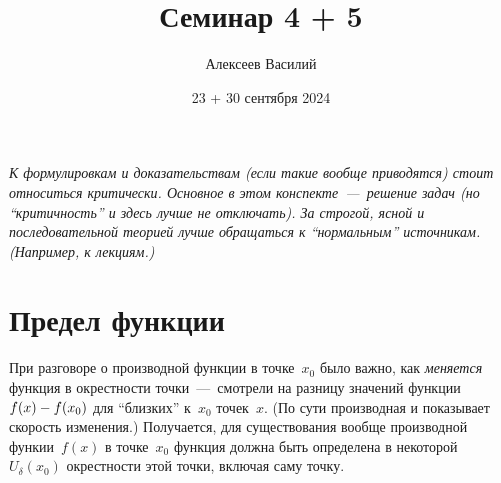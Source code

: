 \documentclass[a4paper,12pt]{article}
\author{Алексеев Василий}
\title{Семинар 4 + 5}
\date{23 + 30 сентября 2024}
\begin{document}
  \maketitle
  
  \tableofcontents

  \thispagestyle{empty}
  
  \newpage
  
  
  
  \vspace*{\fill}
  
  \noindent
  \emph{
    К формулировкам и доказательствам (если такие вообще приводятся) стоит относиться критически.
    Основное в этом конспекте~---~решение задач (но ``критичность'' и здесь лучше не отключать).
    За строгой, ясной и последовательной теорией лучше обращаться к ``нормальным'' источникам.
    (Например, к лекциям.)
  }
  
  \vspace*{\fill}
  
  \thispagestyle{empty}
  
  \newpage
  
  


  

  
  

  \section{Предел функции}

  При разговоре о производной функции в точке~$x_0$ было важно, как \emph{меняется} функция в окрестности точки~---~смотрели на разницу значений функции $f(x) \hm- f(x_0)$ для ``близких'' к~$x_0$ точек~$x$.
  (По сути производная и показывает скорость изменения.)
  Получается, для существования вообще производной функии~$f(x)$ в точке~$x_0$ функция должна быть определена в некоторой $U_{\delta}(x_0)$ окрестности этой точки, включая саму точку.
\end{document}
